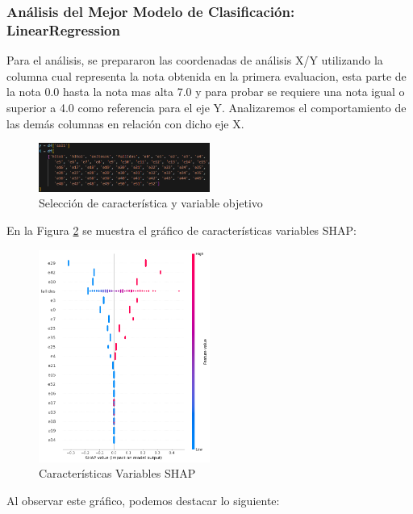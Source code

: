 \subsubsection{Análisis del Mejor Modelo de Clasificación: LinearRegression}

Para el análisis, se prepararon las coordenadas de análisis X/Y utilizando la columna  cual representa la nota obtenida en la primera evaluacion, esta parte de la nota 0.0 hasta la nota mas alta 7.0 y para probar se requiere una nota igual o superior a 4.0 como referencia para el eje Y. Analizaremos el comportamiento de las demás columnas en relación con dicho eje X.

\begin{figure}[H]
    \centering
    \includegraphics[width=0.5\textwidth]{img/shap_lr/dependencia_variable_objetivo.png}
    \caption{Selección de característica y variable objetivo}
    \label{fig:variables_entrenamiento_lr}
\end{figure}

En la Figura \ref{fig:caract_var_shap_lr1} se muestra el gráfico de características variables SHAP:

\begin{figure}[H]
    \centering
    \includegraphics[width=0.5\textwidth]{img/shap_lr/shapForcePlot_lr.png}
    \caption{Características Variables SHAP}
    \label{fig:caract_var_shap_lr1}
\end{figure}

Al observar este gráfico, podemos destacar lo siguiente:

